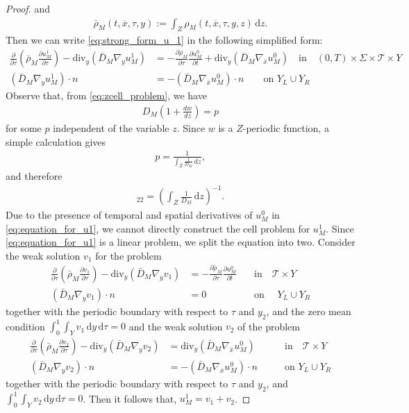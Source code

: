 \documentclass[11pt]{article}
\def\p{\partial}
\def\T{\mathcal{T}}
\newcommand{\di}[1]{\,\mathrm{d}#1}
\begin{document}
\begin{proof}
     and
     \begin{align*}
         \bar \rho_M(t,\overline{x},\tau,y):=\int_Z \rho_M(t,\overline{x},\tau,y,z) \di{z}.
     \end{align*}
     Then we can write \eqref{eq:strong_form_u_1} in the following simplified form:
     \begin{align}\label{eq:equation_for_u1}
          \frac{\partial}{\partial \tau}\left(\bar \rho_M \frac{\partial u_M^1}{\partial \tau}\right)-\mathrm{div}_y\left(\bar D_M\nabla_yu_M^1\right)&=-\frac{\partial \bar \rho_M}{\partial \tau}\frac{\p u_M^0}{\p t}+\mathrm{div}_y\left(\bar D_M\nabla_{\bar x}u_M^0\right)\quad\mbox{in}\quad (0,T)\times\Sigma\times \T\times Y\\
          \left(\bar D_M\nabla_yu_M^1\right)\cdot n &=-\left(\bar D_M\nabla_{\bar x}u_M^0\right)\cdot n \qquad\mbox{on } Y_L\cup Y_R
     \end{align}
Observe that, from  \eqref{eq:zcell_problem}, we have 
\begin{align*}
    D_M\left(1+\frac{dw}{dz}\right)=p
\end{align*}
for some $p$ independent of the variable $z$. Since $w$ is a $ Z$-periodic function, a simple calculation gives
\begin{align*}
    p=\frac{1}{\int_Z\frac{1}{D_M}\di{z}},
\end{align*}
    and  therefore
     \begin{align*}
         [\bar D_M]_{22}=\left(\int_Z\frac{1}{ D_M}\di{z}\right)^{-1}.
     \end{align*}
   Due to the presence of temporal and spatial derivatives of $u_M^0$ in \eqref{eq:equation_for_u1}, we cannot directly construct the cell problem for $u_M^1$. Since \eqref{eq:equation_for_u1} is a linear problem, we split the equation into two.  Consider the weak solution $v_1$  for the problem
     \begin{align}
          \frac{\partial}{\partial \tau}\left(\bar \rho_M \frac{\partial v_1}{\partial \tau}\right)-\mathrm{div}_y\left(\bar D_M\nabla_yv_1\right)&=-\frac{\partial \bar \rho_M}{\partial \tau}\frac{\p u_M^0}{\p t}\quad&\mbox{in}\quad \T\times Y
          \\
          \left(\bar D_M\nabla_yv_1\right)\cdot n &=0 \qquad&\mbox{on }\quad Y_L\cup Y_R
     \end{align}
   together with the periodic boundary with respect to $\tau$ and $y_2$, and the zero mean condition $\int_0^1\int_{Y}v_1\di{y}\di{\tau=0}$ and the weak solution $v_2$ of the problem
     \begin{align}
          \frac{\partial}{\partial \tau}\left(\bar \rho_M \frac{\partial v_2}{\partial \tau}\right)-\mathrm{div}_y\left(\bar D_M\nabla_yv_2\right)&=\mathrm{div}_y\left(\bar D_M\nabla_{\bar x}u_M^0\right)\qquad&\mbox{in}\quad \T\times Y\\
          \left(\bar D_M\nabla_yv_2\right)\cdot n &=-\left(\bar D_M\nabla_{\bar x}u_M^0\right)\cdot n \qquad&\mbox{on } Y_L\cup Y_R
     \end{align}
     together with the periodic boundary with respect to $\tau$ and $y_2$, and $\int_0^1\int_{Y}v_2\di{y}\di{\tau=0}$.   
Then it follows that, $u_M^1=v_1+v_2$.


\end{proof}
\end{document}

